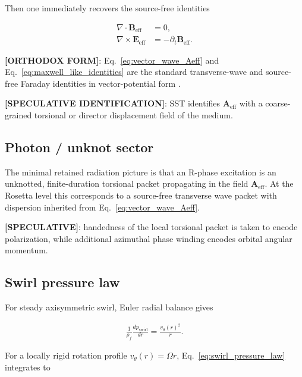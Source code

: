 \documentclass[11pt]{article}
\theoremstyle{definition}
\theoremstyle{plain}
\theoremstyle{remark}
\newcommand{\rhoF}{{\rho_{\!f}}}
\begin{document}
        Then one immediately recovers the source-free identities

        \begin{align}
            \nabla\cdot \mathbf{B}_{\mathrm{eff}} &= 0, \\
            \nabla\times \mathbf{E}_{\mathrm{eff}} &= -\partial_t \mathbf{B}_{\mathrm{eff}}.
            \label{eq:maxwell_like_identities}
        \end{align}

        \textbf{[ORTHODOX FORM]}: Eq.~\eqref{eq:vector_wave_Aeff} and Eq.~\eqref{eq:maxwell_like_identities} are the standard transverse-wave and source-free Faraday identities in vector-potential form \cite{Jackson1999}.

        \textbf{[SPECULATIVE IDENTIFICATION]}: SST identifies $\mathbf{A}_{\mathrm{eff}}$ with a coarse-grained torsional or director displacement field of the medium.

    \subsection{Photon / unknot sector}

        The minimal retained radiation picture is that an R-phase excitation is an unknotted, finite-duration torsional packet propagating in the field $\mathbf{A}_{\mathrm{eff}}$. At the Rosetta level this corresponds to a source-free transverse wave packet with dispersion inherited from Eq.~\eqref{eq:vector_wave_Aeff}.

        \textbf{[SPECULATIVE]}: handedness of the local torsional packet is taken to encode polarization, while additional azimuthal phase winding encodes orbital angular momentum.

    \subsection{Swirl pressure law}
        \label{subsec:swirl_pressure_law}

        For steady axisymmetric swirl, Euler radial balance gives

        \begin{align}
            \frac{1}{\rhoF}\frac{dp_{\mathrm{swirl}}}{dr} = \frac{v_\theta(r)^2}{r}.
            \label{eq:swirl_pressure_law}
        \end{align}

        For a locally rigid rotation profile $v_\theta(r)=\Omega r$, Eq.~\eqref{eq:swirl_pressure_law} integrates to
\end{document}
